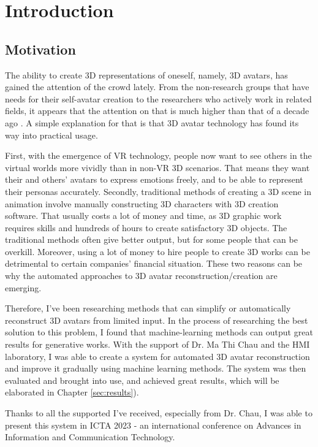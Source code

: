 \section{Introduction}
\label{sec:intro}

\subsection{Motivation}
\label{sec:intro/motivation}
The ability to create 3D representations of oneself, namely, 3D avatars, has gained the attention of the crowd lately. From the non-research groups that have needs for their self-avatar creation to the researchers who actively work in related fields, it appears that the attention on that is much higher than that of a decade ago \citationneeded. A simple explanation for that is that 3D avatar technology has found its way into practical usage.

First, with the emergence of VR technology, people now want to see others in the virtual worlds more vividly than in non-VR 3D scenarios. That means they want their and others' avatars to express emotions freely, and to be able to represent their personas accurately. Secondly, traditional methods of creating a 3D scene in animation involve manually constructing 3D characters with 3D creation software. That usually costs a lot of money and time, as 3D graphic work requires skills and hundreds of hours to create satisfactory 3D objects. The traditional methods often give better output, but for some people that can be overkill. Moreover, using a lot of money to hire people to create 3D works can be detrimental to certain companies' financial situation. These two reasons can be why the automated approaches to 3D avatar reconstruction/creation are emerging.

Therefore, I've been researching methods that can simplify or automatically reconstruct 3D avatars from limited input. In the process of researching the best solution to this problem, I found that machine-learning methods can output great results for generative works. With the support of Dr. Ma Thi Chau and the HMI laboratory, I was able to create a system for automated 3D avatar reconstruction and improve it gradually using machine learning methods. The system was then evaluated and brought into use, and achieved great results, which will be elaborated in Chapter \ref{sec:results}).

Thanks to all the supported I've received, especially from Dr. Chau, I was able to present this system in ICTA 2023 - an international conference on Advances in Information and Communication Technology.



